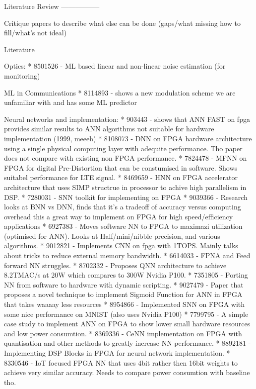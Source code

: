 
\iffalse
Literature Review
-----------------

Critique papers to describe what else can be done (gaps/what missing how to fill/what's not ideal)

Literature

Optics:
* 8501526 - ML based linear and non-linear noise estimation (for monitoring)

ML in Communications
* 8114893 - shows a new modulation scheme we are unfamiliar with and has some ML predictor

Neural networks and implementation:
* 903443 - shows that ANN FAST on fpga provides similar results to ANN algorithms not suitable for hardware implementation (1999, meeeh)
* 8108073 - DNN on FPGA hardware architecture using a single physical computing layer with adequite performance. Tho paper does not compare with existing non FPGA performance.
* 7824478 - MFNN on FPGA for digital Pre-Distortion that can be constumised in software. Shows suitabel performance for LTE signal.
* 8469659 - HNN on FPGA accelerator architecture that uses SIMP structrue in processor to achive high parallelism in DSP.
* 7280031 - SNN toolkit for implementing on FPGA
* 9039366 - Research looks at BNN vs DNN, finds that it's a tradeoff of accuracy versus computing overhead this a great way to implement on FPGA for high speed/efficiency applications
* 6927383 - Moves software NN to FPGA to maximazi utilization (optimised for ANN). Looks at Half/mini/nibble precision, and various algorithms.
* 9012821 - Implements CNN on fpga with 1TOPS. Mainly talks about tricks to reduce external memory bandwidth.
* 6614033 - FPNA and Feed forward NN struggles.
* 8702332 - Proposes QNN architecture to achieve 8.2TMAC/s at 20W which compares to 300W Nvidia P100.
* 7351805 - Porting NN from software to hardware with dynamic scripting.
* 9027479 - Paper that proposes a novel technique to implement Sigmoid Function for ANN in FPGA that takes waaaay less resources
* 8954866 - Implemented SNN on FPGA with some nice performance on MNIST (also uses Nvidia P100)
* 7799795 - A simple case study to implement ANN on FPGA to show lower small hardware resources and low power consumtion.
* 8369336 - CeNN implementation on FPGA with quantisation and other methods to greatly increase NN performance.
* 8892181 - Implementing DSP Blocks in FPGA for neural network implementation.
* 8330546 - IoT focused FPGA NN that uses 4bit rather then 16bit weights to achieve very similar accuracy. Needs to compare power consumtion with baseline tho.
